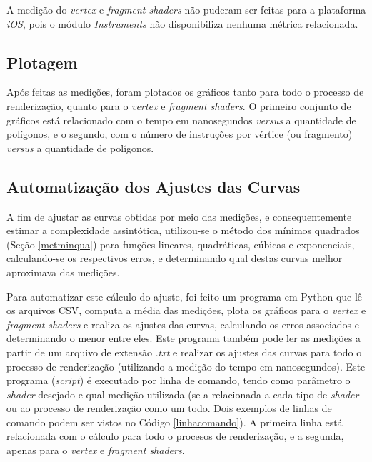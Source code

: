 	A medição do \textit{vertex} e \textit{fragment shaders} não puderam ser feitas para a plataforma \textit{iOS}, pois o módulo \textit{Instruments} não disponibiliza nenhuma métrica relacionada.

\subsection{Plotagem}

	Após feitas as medições, foram plotados os gráficos tanto para todo o processo de renderização, quanto para o \textit{vertex} e \textit{fragment shaders}. O primeiro conjunto de gráficos está relacionado com o tempo em nanosegundos \textit{versus} a quantidade de polígonos, e o segundo, com o número de instruções por vértice (ou fragmento) \textit{versus} a quantidade de polígonos.

\subsection{Automatização dos Ajustes das Curvas}

	A fim de ajustar as curvas obtidas por meio das medições, e consequentemente estimar a complexidade assintótica, utilizou-se o método dos mínimos quadrados (Seção \ref{metminqua}) para funções lineares, quadráticas, cúbicas e exponenciais, calculando-se os respectivos erros, e determinando qual destas curvas melhor aproximava das medições. 

	 Para automatizar este cálculo do ajuste, foi feito um programa em Python que lê os arquivos CSV, computa a média das medições, plota os gráficos para o \textit{vertex} e \textit{fragment} \textit{shaders} e realiza os ajustes das curvas, calculando os erros associados e determinando o menor entre eles.  Este programa também pode ler as medições a partir de um arquivo de extensão .\textit{txt} e realizar os ajustes das curvas para todo o processo de renderização (utilizando a medição do tempo em nanosegundos). Este programa (\textit{script}) é executado por linha de comando, tendo como parâmetro o \textit{shader} desejado e qual medição utilizada (se a relacionada a cada tipo de \textit{shader} ou ao processo de renderização como um todo. Dois exemplos de linhas de comando podem ser vistos no Código \ref{linhacomando}). A primeira linha está relacionada com o cálculo para todo o procesos de renderização, e a segunda, apenas para o \textit{vertex} e \textit{fragment shaders}.

	

